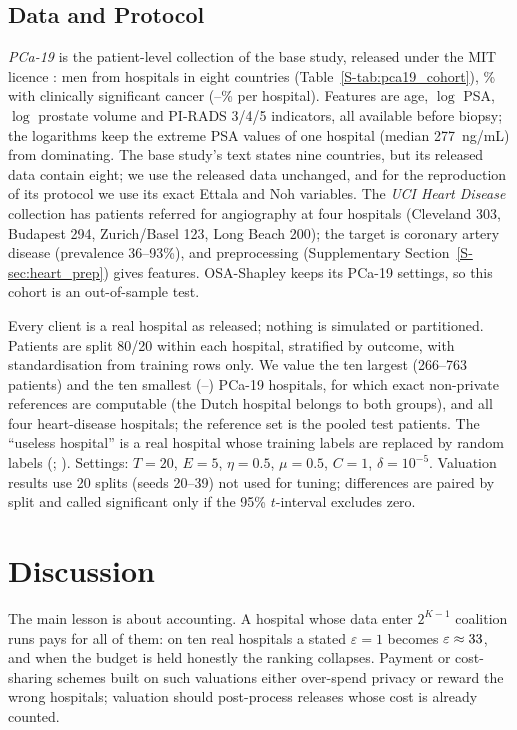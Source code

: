 \documentclass[journal]{IEEEtran}
\begin{document}
\subsection{Data and Protocol}
\label{sec:data}
\label{sec:silos}
\emph{PCa-19} is the patient-level collection of the base study, released under the MIT licence \cite{Kazlouski2025HospitalParticipation}: \pNineN{} men from \pNineHosp{} hospitals in eight countries (Table~\ref{S-tab:pca19_cohort}), \pNinePrev\% with clinically significant cancer (\pNinePrevLo--\pNinePrevHi\% per hospital). Features are age, $\log$ PSA, $\log$ prostate volume and PI-RADS 3/4/5 indicators, all available before biopsy; the logarithms keep the extreme PSA values of one hospital (median 277~ng/mL) from dominating. The base study's text states nine countries, but its released data contain eight; we use the released data unchanged, and for the reproduction of its protocol we use its exact Ettala and Noh variables. The \emph{UCI Heart Disease} collection \cite{Janosi1988HeartDisease, Detrano1989Heart} has \hrN{} patients referred for angiography at four hospitals (Cleveland 303, Budapest 294, Zurich/Basel 123, Long Beach 200); the target is coronary artery disease (prevalence 36--93\%), and preprocessing (Supplementary Section~\ref{S-sec:heart_prep}) gives \hrFeat{} features. OSA-Shapley keeps its PCa-19 settings, so this cohort is an out-of-sample test.

Every client is a real hospital as released; nothing is simulated or partitioned. Patients are split 80/20 within each hospital, stratified by outcome, with standardisation from training rows only. We value the ten largest (266--763 patients) and the ten smallest (\pxSmallMin--\pxSmallMax) PCa-19 hospitals, for which exact non-private references are computable (the Dutch hospital belongs to both groups), and all four heart-disease hospitals; the reference set is the pooled test patients. The ``useless hospital'' is a real hospital whose training labels are replaced by random labels (\corrHosp{}; \hrCorrupt{}). Settings: $T=20$, $E=5$, $\eta=0.5$, $\mu=0.5$, $C=1$, $\delta=10^{-5}$. Valuation results use 20 splits (seeds 20--39) not used for tuning; differences are paired by split and called significant only if the 95\% $t$-interval excludes zero.



\section{Discussion}
\label{sec:discussion}
The main lesson is about accounting. A hospital whose data enter $2^{K-1}$ coalition runs pays for all of them: on ten real hospitals a stated $\varepsilon=1$ becomes $\varepsilon\approx33$, and when the budget is held honestly the ranking collapses. Payment or cost-sharing schemes built on such valuations either over-spend privacy or reward the wrong hospitals; valuation should post-process releases whose cost is already counted.
\end{document}
